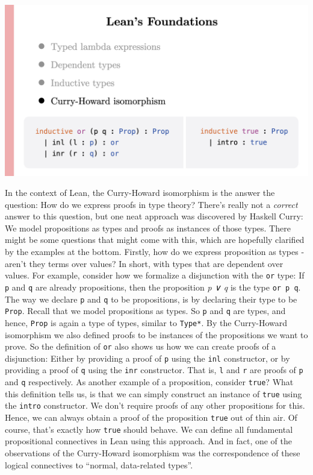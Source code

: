\documentclass{article}
\begin{document}
\begin{center}
  \includegraphics[width=\columnwidth]{Slides/Slide 7.jpeg}
\end{center}

In the context of Lean, the Curry-Howard isomorphism is the answer the
question: How do we express proofs in type theory? There's really not a
\emph{correct} answer to this question, but one neat approach was
discovered by Haskell Curry: We model propositions as types and proofs
as instances of those types. There might be some questions that might
come with this, which are hopefully clarified by the examples at the
bottom. Firstly, how do we express proposition as types - aren't they
terms over values? In short, with types that are dependent over values.
For example, consider how we formalize a disjunction with the
\lstinline{or} type: If \lstinline{p} and \lstinline{q} are already propositions,
then the proposition \emph{p ∨ q} is the type \lstinline{or p q}. The way
we declare \lstinline{p} and \lstinline{q} to be propositions, is by declaring
their type to be \lstinline{Prop}. Recall that we model propositions as
types. So \lstinline{p} and \lstinline{q} are types, and hence, \lstinline{Prop}
is again a type of types, similar to \lstinline{Type*}. By the Curry-Howard
isomorphism we also defined proofs to be instances of the propositions
we want to prove. So the definition of \lstinline{or} also shows us how we
can create proofs of a disjunction: Either by providing a proof of
\lstinline{p} using the \lstinline{inl} constructor, or by providing a proof
of \lstinline{q} using the \lstinline{inr} constructor. That is, \lstinline{l}
and \lstinline{r} are proofs of \lstinline{p} and \lstinline{q} respectively. As
another example of a proposition, consider \lstinline{true}? What this
definition tells us, is that we can simply construct an instance of
\lstinline{true} using the \lstinline{intro} constructor. We don't require
proofs of any other propositions for this. Hence, we can always obtain a
proof of the proposition \lstinline{true} out of thin air. Of course,
that's exactly how \lstinline{true} should behave. We can define all
fundamental propositional connectives in Lean using this approach. And
in fact, one of the observations of the Curry-Howard isomorphism was the
correspondence of these logical connectives to ``normal, data-related
types''.
\end{document}
